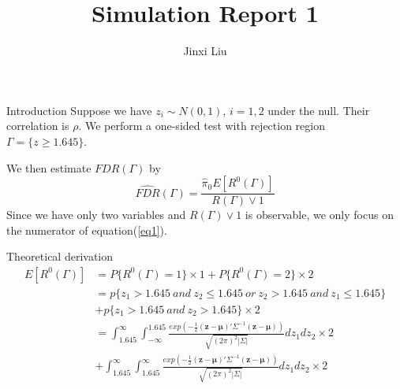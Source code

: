 \documentclass{beamer}
\title{Simulation Report 1}
\author{Jinxi Liu}
\begin{document}
	
\begin{frame}
	
	\titlepage
	
\end{frame}


\begin{frame}[t]{Introduction}\vspace{10pt}
Suppose we have $z_i \sim N(0,1)$, $i=1,2$ under the null. Their correlation is $\rho$. We perform a one-sided test with rejection region $\Gamma = \{z \geq 1.645\}.$

We then estimate $FDR(\Gamma)$ by 
\begin{equation}\label{eq1}
 \hat{FDR}(\Gamma) = \frac{\hat{\pi}_0 E[R^0(\Gamma)]}{ R(\Gamma)\vee 1}
\end{equation}
Since we have only two variables and $R(\Gamma)\vee 1$ is observable, we only focus on the numerator of equation(\ref{eq1}).
\end{frame}

\begin{frame}[t]{Theoretical derivation}\vspace{10pt}
\begin{equation} \label{eq2}
\begin{split}
E[R^0(\Gamma)]  &= P\{R^0(\Gamma) =1 \} \times 1 + P\{R^0(\Gamma) =2 \} \times 2 \\
 &= p\{z_1 > 1.645 \ and \ z_2 \leq 1.645 \ or \ z_2 > 1.645 \ and \ z_1 \leq 1.645 \} \\
 &+ p\{z_1 > 1.645 \ and \ z_2 > 1.645 \} \times 2 \\
 &= \int_{1.645}^{\infty} \int_{-\infty}^{1.645} \frac{exp(-\frac{1}{2}(\boldsymbol{z}-\boldsymbol{\mu})'\Sigma^{-1}(\boldsymbol{z}-\boldsymbol{\mu}))}{\sqrt{(2\pi)^2|\Sigma|}} dz_1dz_2 \times 2\\
 & + \int_{1.645}^{\infty} \int_{1.645}^{\infty} \frac{exp(-\frac{1}{2}(\boldsymbol{z}-\boldsymbol{\mu})'\Sigma^{-1}(\boldsymbol{z}-\boldsymbol{\mu}))}{\sqrt{(2\pi)^2|\Sigma|}} dz_1dz_2 \times 2
\end{split}
\end{equation}

\end{frame}
\end{document}
